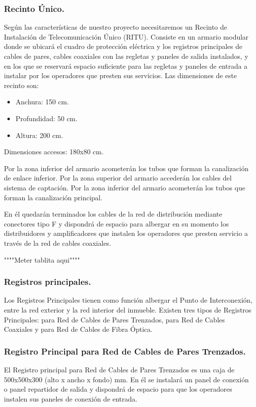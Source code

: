\subsubsection{Recinto Único.}
Según las características de nuestro proyecto necesitaremos un Recinto de Instalación de Telecomunicación Único (RITU). Consiste en un armario modular donde se ubicará el cuadro de protección eléctrica y los registros principales de cables de pares, cables coaxiales con las regletas y paneles de salida instalados, y en los que se reservará espacio suficiente para las regletas y paneles de entrada a instalar por los operadores que presten sus servicios.
Las dimensiones de este recinto son:
\begin{itemize}
	\item Anchura: 150 cm.
	\item Profundidad: 50 cm.
	\item Altura: 200 cm.
\end{itemize}
Dimensiones accesos: 180x80 cm.

Por la zona inferior del armario acometerán los tubos que forman la canalización de enlace inferior.
Por la zona superior del armario accederán los cables del sistema de captación.
Por la zona inferior del armario acometerán los tubos que forman la canalización principal.

En él quedarán terminados los cables de la red de distribución mediante conectores tipo F y dispondrá de espacio para albergar en su momento los distribuidores y amplificadores que instalen los operadores que presten servicio a través de la red de cables coaxiales.

""""Meter tablita aqui""""

\subsubsection{Registros principales.}
Los Registros Principales tienen como función albergar el Punto de Interconexión, entre la red exterior y la red interior del inmueble.
Existen tres tipos de Registros Principales: para Red de Cables de Pares Trenzados, para Red de Cables Coaxiales y para Red de Cables de Fibra Óptica.

\subsubsection*{Registro Principal para Red de Cables de Pares Trenzados.}
El Registro principal para Red de Cables de Pares Trenzados es una caja de 500x500x300 (alto x ancho x fondo) mm.
En él se instalará un panel de conexión o panel repartidor de salida y dispondrá de espacio para que los operadores instalen sus paneles de conexión de entrada.

